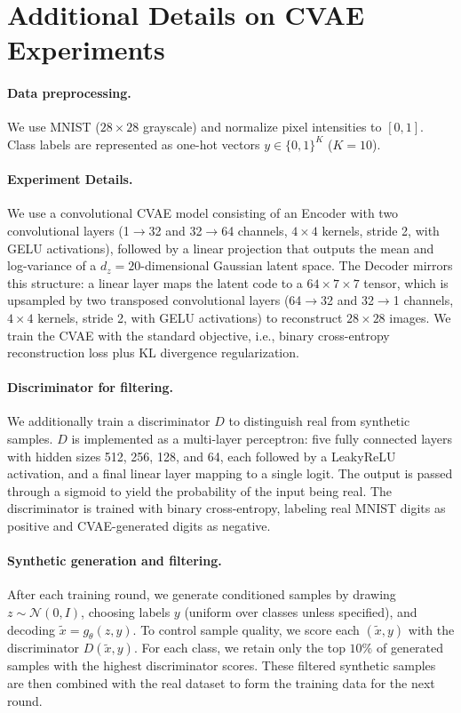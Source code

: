 \clearpage
\section{Additional Details on CVAE Experiments}\label{app:detail}


\paragraph{Data preprocessing.}
We use MNIST ($28\times 28$ grayscale) and normalize pixel intensities to $[0,1]$. 
Class labels are represented as one-hot vectors $y\in\{0,1\}^{K}$ ($K{=}10$). 

\paragraph{Experiment Details.} 
We use a convolutional CVAE model consisting of an Encoder with two convolutional layers 
(1$\to$32 and 32$\to$64 channels, $4\times4$ kernels, stride 2, with GELU activations), 
followed by a linear projection that outputs the mean and log-variance of a $d_z=20$-dimensional 
Gaussian latent space. 
The Decoder mirrors this structure: a linear layer maps the latent code to a 
$64\times7\times7$ tensor, which is upsampled by two transposed convolutional layers 
(64$\to$32 and 32$\to$1 channels, $4\times4$ kernels, stride 2, with GELU activations) 
to reconstruct $28\times28$ images. 
We train the CVAE with the standard objective, i.e., binary cross-entropy reconstruction loss 
plus KL divergence regularization.


\paragraph{Discriminator for filtering.} 
We additionally train a discriminator $D$ to distinguish real from synthetic samples. 
$D$ is implemented as a multi-layer perceptron: five fully connected layers with hidden sizes 
512, 256, 128, and 64, each followed by a LeakyReLU activation, 
and a final linear layer mapping to a single logit. 
The output is passed through a sigmoid to yield the probability of the input being real. 
The discriminator is trained with binary cross-entropy, labeling real MNIST digits as positive 
and CVAE-generated digits as negative. 

\paragraph{Synthetic generation and filtering.}
After each training round, we generate conditioned samples by drawing 
$z \sim \mathcal{N}(0,I)$, choosing labels $y$ (uniform over classes unless specified), 
and decoding $\tilde{x} = g_{\theta}(z,y)$. 
To control sample quality, we score each $(\tilde{x},y)$ with the discriminator $D(\tilde{x},y)$. 
For each class, we retain only the top $10\%$ of generated samples with the highest discriminator 
scores. These filtered synthetic samples are then combined with the real dataset to form the 
training data for the next round. 



